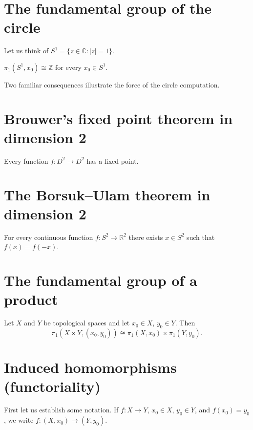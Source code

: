 \section{The fundamental group of the circle}
\label{section-fundamental-group-circle}

Let us think of
$S^1=\{z\in\mathbb{C}:|z|=1\}$.

\begin{theorem}
$\pi_1(S^1,x_0)\cong\mathbb{Z}$ for every
$x_0\in S^1$.
\end{theorem}

Two familiar consequences illustrate the
force
of the circle computation.
\section{Brouwer's fixed point theorem in
dimension 2}
\label{section-brouwer-fixed-point}

\begin{theorem}
Every function $f:D^2\to D^2$ has a fixed
point.
\end{theorem}
\section{The Borsuk--Ulam theorem in
dimension 2}
\label{section-borsuk-ulam}

\begin{theorem}
For every continuous function
$f:S^2\to\mathbb{R}^2$ there exists
$x\in S^2$ such that $f(x)=f(-x)$.
\end{theorem}
\section{The fundamental group of a product}
\label{section-fundamental-group-product}

\begin{theorem}
Let $X$ and $Y$ be topological spaces and let
$x_0\in X$,
$y_0\in Y$. Then
$$
\pi_1(X\times Y,(x_0,y_0))
\cong
\pi_1(X,x_0)\times\pi_1(Y,y_0).
$$
\end{theorem}
\section{Induced homomorphisms
(functoriality)}
\label{section-induced-fundamental-map}

First let us establish some notation. If
$f:X\to Y$,
$x_0\in X$, $y_0\in Y$, and $f(x_0)=y_0$, we
write
$f:(X,x_0)\to(Y,y_0)$.

